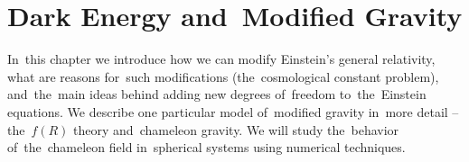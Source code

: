 \chapter{Dark Energy and~Modified Gravity}
\label{chpt:de_mg}
In~this chapter we introduce how we can modify Einstein's general relativity, what are reasons for~such modifications (the~cosmological constant problem), and~the~main ideas behind adding new degrees of~freedom to~the~Einstein equations. We describe one particular model of~modified gravity in~more detail -- the~$f(R)$ theory and~chameleon gravity. We will study the~behavior of~the~chameleon field in~spherical systems using numerical techniques.




% 



% 